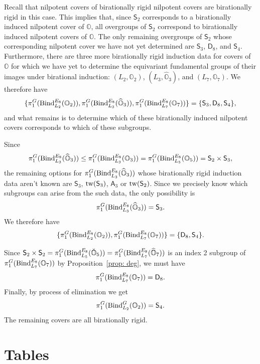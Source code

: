 \documentclass[11pt]{amsart}
\renewcommand{\O}{{\mathbb O}}
\newcommand{\Dih}{{\mathsf{D}}}
\newcommand{\Alt}{{\mathsf{A}}}
\newcommand{\Sym}{{\mathsf{S}}}
\newcommand{\tw}{{{\mbox{\rm tw}}}}
\newcommand{\BInd}{{{\mbox{\rm Bind}}}}
\newcommand{\hatO}{\widehat{\O}}
\newcommand{\breveO}{\breve{\O}}
\numberwithin{equation}{section}
\begin{document}
	Recall that nilpotent covers of birationally rigid nilpotent covers are birationally rigid in this case. This implies that, since $\Sym_2$ corresponds to a birationally induced nilpotent cover of $\O$, all overgroups of $\Sym_2$ correspond to birationally induced nilpotent covers of $\O$. The only remaining overgroups of $\Sym_2$ whose corresponding nilpotent cover we have not yet determined are $\Sym_3$, $\Dih_8$, and $\Sym_4$. Furthermore, there are three more birationally rigid induction data for covers of $\O$ for which we have yet to determine the equivariant fundamental groups of their images under birational induction: $(L_2,\O_2)$,  $(L_3,\hatO_3)$, and $(L_7,\O_7)$. We therefore have $$\{\pi_1^G(\BInd_{L_2}^{E_8}(\O_2)),\pi_1^G(\BInd_{L_3}^{E_8}(\hatO_3)),\pi_1^G(\BInd_{L_7}^{E_8}(\O_7))\}=\{\Sym_3, \Dih_8, \Sym_4\},$$ and what remains is to determine which of these birationally induced nilpotent covers corresponds to which of these subgroups.
	
	
	Since $$\pi_1^G(\BInd_{L_3}^{E_8}(\hatO_3))\leq \pi_1^G(\BInd_{L_3}^{E_8}(\O_3))=\pi_1^G(\BInd_{L_5}^{E_8}(\O_5))=\Sym_2\times \Sym_3,$$ the remaining options for $\pi_1^G(\BInd_{L_3}^{E_8}(\hatO_3))$ whose birationally rigid induction data aren't known are  $\Sym_3$, $\tw(\Sym_3)$, $\Alt_3$ or $\tw(\Sym_2)$. Since we precisely know which subgroups can arise from the such data, the only possibility is $$\pi_1^G(\BInd_{L_3}^{E_8}(\hatO_3))=\Sym_3.$$ We therefore have $$\{\pi_1^G(\BInd_{L_2}^{E_8}(\O_2)),\pi_1^G(\BInd_{L_7}^{E_8}(\O_7))\}=\{\Dih_8, \Sym_4\}.$$
	
	Since $\Sym_2\times \Sym_2=\pi_1^G(\BInd_{L_5}^{E_8}(\breveO_5))=\pi_1^G(\BInd_{L_7}^{E_8}(\hatO_7))$ is an index 2 subgroup of $\pi_1^G(\BInd_{L_7}^{E_8}(\O_7))$ by Proposition~\ref{prop: deg}, we must have $$\pi_1^G(\BInd_{L_7}^{E_8}(\O_7))=\Dih_8.$$
	Finally, by process of elimination we get $$\pi_1^G(\BInd_{L_2}^{G}(\O_2))=\Sym_4.$$ The remaining covers are all birationally rigid.
	
	
	\section{Tables}\label{s: Tables}
	
\end{document}

